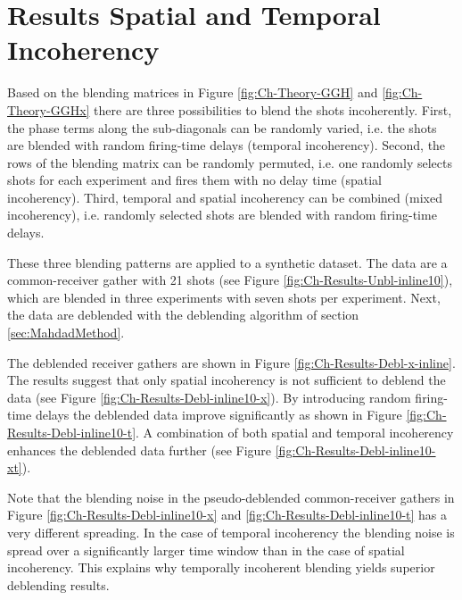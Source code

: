 \FloatBarrier

\section{Results Spatial and Temporal Incoherency}

Based on the blending matrices in Figure \ref{fig:Ch-Theory-GGH} and \ref{fig:Ch-Theory-GGHx} there are three possibilities to blend the shots incoherently. First, the phase terms along the sub-diagonals can be randomly varied, i.e. the shots are blended with random firing-time delays (temporal incoherency). Second, the rows of the blending matrix can be randomly permuted, i.e. one randomly selects shots for each experiment and fires them with no delay time (spatial incoherency). Third, temporal and spatial incoherency can be combined (mixed incoherency), i.e. randomly selected shots are blended with random firing-time delays.

These three blending patterns are applied to a synthetic dataset. The data are a common-receiver gather with 21 shots (see Figure \ref{fig:Ch-Results-Unbl-inline10}), which are blended in three experiments with seven shots per experiment. Next, the data are deblended with the deblending algorithm of section \ref{sec:MahdadMethod}. 

The deblended receiver gathers are shown in Figure \ref{fig:Ch-Results-Debl-x-inline}. The results suggest that only spatial incoherency is not sufficient to deblend the data (see Figure \ref{fig:Ch-Results-Debl-inline10-x}). By introducing random firing-time delays the deblended data improve significantly as shown in Figure \ref{fig:Ch-Results-Debl-inline10-t}. A combination of both spatial and temporal incoherency enhances the deblended data further (see Figure \ref{fig:Ch-Results-Debl-inline10-xt}).

Note that the blending noise in the pseudo-deblended common-receiver gathers in Figure \ref{fig:Ch-Results-Debl-inline10-x} and \ref{fig:Ch-Results-Debl-inline10-t} has a very different spreading. In the case of temporal incoherency the blending noise is spread over a significantly larger time window than in the case of spatial incoherency. This explains why temporally incoherent blending yields superior deblending results.


